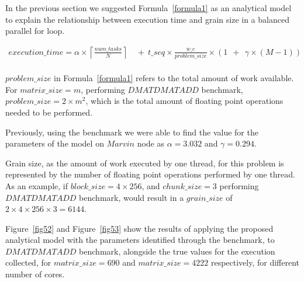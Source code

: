 In the previous section we suggested Formula~\ref{formula1} as an analytical model to explain the relationship between execution time and grain size in a balanced parallel for loop.    

\begin{equation}
\begin{aligned}
execution\_time = 
\alpha\times{\left\lceil{\frac{num\_{tasks}}{N}}\right\rceil}\:\:&+\:\:t\_{seq}\times{\frac{w\_c}{problem\_{size}}}\times{(1\:\:+\:\:\gamma\times{(M-1)})}\:\:\\
\end{aligned}
\end{equation}

$problem\_{size}$ in Formula~\ref{formula1} refers to the total amount of work available. For $matrix\_{size}=m$, performing $DMATDMATADD$ benchmark, $problem\_{size}=2\times{m^2}$, which is the total amount of floating point operations needed to be performed.
 
Previously, using the benchmark we were able to find the value for the parameters of the model on $Marvin$ node as $\alpha=3.032$ and $\gamma=0.294$. 

Grain size, as the amount of work executed by one thread, for this problem is represented by the number of floating point operations performed by one thread. As an example, if $block\_{size}=4\times{256}$, and $chunk\_{size}=3$ performing $DMATDMATADD$ benchmark, would result in a $grain\_{size}$ of $2\times{4\times{256}\times{3}}=6144$. 

Figure~\ref{fig52} and Figure~\ref{fig53} show the results of applying the proposed analytical model with the parameters identified through the benchmark, to $DMATDMATADD$ benchmark, alongside the true values for the execution collected, for $matrix\_{size}=690$ and $matrix\_{size}=4222$ respectively, for different number of cores. 


